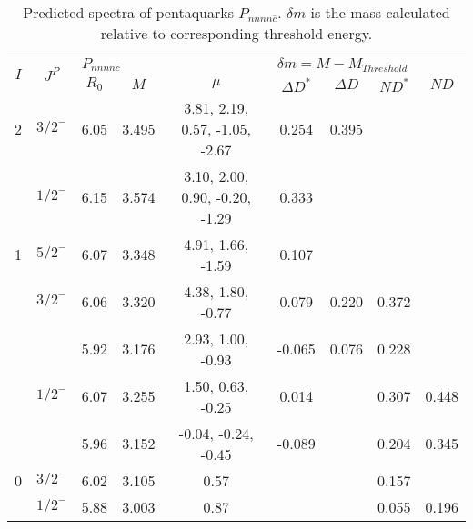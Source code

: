 \documentclass[prd,twocolumn,floatfix,nofootinbib]{revtex4}
\begin{document}
\renewcommand{\tabcolsep}{0.4cm}
\renewcommand{\arraystretch}{1.0}
\begin{table*}[!htbp]
    \caption{Predicted spectra of pentaquarks $P_{nnnn\bar{c}}$.
        $\delta m$ is the mass calculated relative to corresponding threshold energy.}
    \label{tab:nnnnc}
    \begin{tabular}{cc|ccc|cccc}
        \bottomrule[1.5pt]\bottomrule[0.5pt]
        \multirow{2}{*}{$I$} &\multirow{2}{*}{$J^{P}$} 
        &\multicolumn{3}{l|}{$P_{nnnn\bar{c}}$} 
        &\multicolumn{4}{l}{$\delta m=M-M_{Threshold}$} \\
        & &$R_{0}$ &$M$ &$\mu$ &$\Delta D^{\ast}$ &$\Delta D$ &$N D^{\ast}$ &$N D$ \\ \hline
        2
            &${3/2}^{-}$    &6.05   &3.495  &3.81, 2.19, 0.57, -1.05, -2.67 &0.254 &0.395 & & \\
            &${1/2}^{-}$    &6.15   &3.574  &3.10, 2.00, 0.90, -0.20, -1.29 &0.333 & & & \\
        1
            &${5/2}^{-}$    &6.07   &3.348  &4.91, 1.66, -1.59 &0.107 & & & \\
            &${3/2}^{-}$    &6.06   &3.320  &4.38, 1.80, -0.77 &0.079 &0.220 &0.372 & \\
            &               &5.92   &3.176  &2.93, 1.00, -0.93 &-0.065 &0.076 &0.228 & \\
            &${1/2}^{-}$    &6.07   &3.255  &1.50, 0.63, -0.25 &0.014 & &0.307 &0.448 \\
            &               &5.96   &3.152  &-0.04, -0.24, -0.45 &-0.089 & &0.204 &0.345 \\
        0
            &${3/2}^{-}$    &6.02   &3.105  &0.57 & & &0.157 & \\
            &${1/2}^{-}$    &5.88   &3.003  &0.87 & & &0.055 &0.196 \\
        \bottomrule[0.5pt]\bottomrule[1.5pt]
    \end{tabular}
\end{table*}
\end{document}
